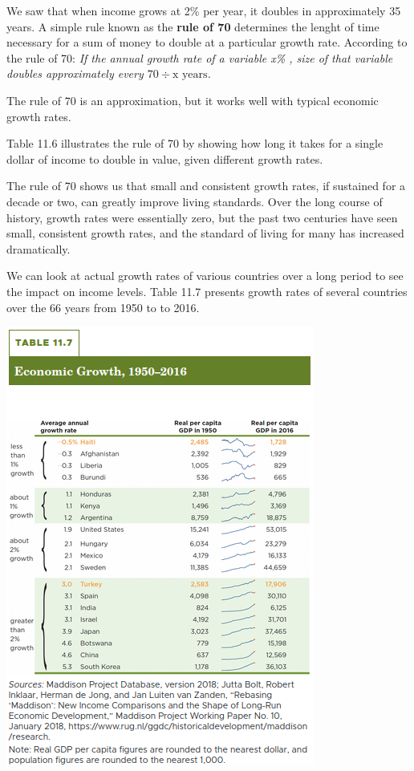 \documentclass[11pt]{article} %
\theoremstyle{plain}
\theoremstyle{definition}
\begin{document}
We saw that when income grows at 2\% per year, it doubles in approximately 35 years. A simple rule known as the \textbf{rule of 70} determines the lenght of time necessary for a sum of money to double at a particular growth rate. According to the rule of 70: \textit{If the annual growth rate of a variable x\% , size of that variable doubles approximately every \(70 \div \text{x years}\).}

The rule of 70 is an approximation, but it works well with typical economic growth rates.

Table 11.6 illustrates the rule of 70 by showing how long it takes for a single dollar of income to double in value, given different growth rates.

The rule of 70 shows us that small and consistent growth rates, if sustained for a decade or two, can greatly improve living standards. Over the long course of history, growth rates were essentially zero, but the past two centuries have seen small, consistent growth rates, and the standard of living for many has increased dramatically.

We can look at actual growth rates of various countries over a long period to see the impact on income levels. Table 11.7 presents growth rates of several countries over the 66 years from 1950 to to 2016.

\begin{center}
\includegraphics[scale=0.5]{../../images/Chapter 11/Table 11.7 .png}
\end{center}
\end{document}
